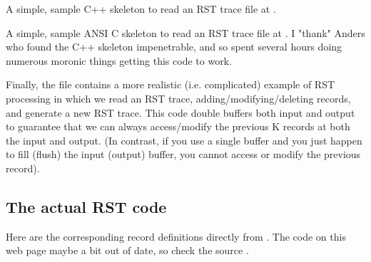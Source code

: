 \documentclass[10pt]{article}
\begin{document}
A simple, sample C++ skeleton to read an RST trace file at
.

A simple, sample ANSI C skeleton to read an RST trace file at
.  I "thank"
Anders who found the C++ skeleton impenetrable, and so spent several
hours doing numerous moronic things getting this code to work.

Finally, the file 
contains a more realistic (i.e. complicated) example of RST processing
in which we read an RST trace, adding/modifying/deleting records, and
generate a new RST trace.  This code double buffers both input and
output to guarantee that we can always access/modify the previous K
records at both the input and output.  (In contrast, if you use a single
buffer and you just happen to fill (flush) the input (output) buffer,
you cannot access or modify the previous record).

\subsection{The actual RST code}

Here are the corresponding record definitions directly from
.  The code on this web page maybe a bit out of date, so
check the source .
\end{document}

